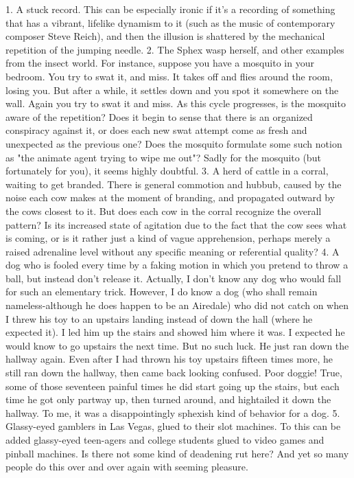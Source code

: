   1. A stuck record. This can be especially ironic if it's a recording of something
     that has a vibrant, lifelike dynamism to it (such as the music of contemporary
     composer Steve Reich), and then the illusion is shattered by the mechanical
     repetition of the jumping needle.
  2. The Sphex wasp herself, and other examples from the insect world. For
     instance, suppose you have a mosquito in your bedroom. You try to swat it,
     and miss. It takes off and flies around the room, losing you. But after a while,
     it settles down and you spot it somewhere on the wall. Again you try to swat
     it and miss. As this cycle progresses, is the mosquito aware of the repetition?
     Does it begin to sense that there is an organized conspiracy against it, or does
     each new swat attempt come as fresh and unexpected as the previous one?
     Does the mosquito formulate some such notion as "the animate agent trying
     to wipe me out"? Sadly for the mosquito (but fortunately for you), it seems
     highly doubtful.
  3. A herd of cattle in a corral, waiting to get branded. There is general
     commotion and hubbub, caused by the noise each cow makes at the moment
     of branding, and propagated outward by the cows closest to it. But does each
     cow in the corral recognize the overall pattern? Is its increased state of
     agitation due to the fact that the cow sees what is coming, or is it rather just a
     kind of vague apprehension, perhaps merely a raised adrenaline level without
     any specific meaning or referential quality?
  4. A dog who is fooled every time by a faking motion in which you pretend to
     throw a ball, but instead don't release it. Actually, I don't know any dog who
     would fall for such an elementary trick. However, I do know a dog (who
     shall remain nameless-although he does happen to be an Airedale) who did
     not catch on when I threw his toy to an upstairs landing instead of down the
     hall (where he expected it). I led him up the stairs and showed him where it
     was. I expected he would know to go upstairs the next time. But no such
     luck. He just ran down the hallway again. Even after I had thrown his toy
     upstairs fifteen times more, he still ran down the hallway, then came back
     looking confused. Poor doggie! True, some of those seventeen painful times
     he did start going up the stairs, but each time he got only partway up, then
     turned around, and hightailed it down the hallway. To me, it was a
     disappointingly sphexish kind of behavior for a dog.
  5. Glassy-eyed gamblers in Las Vegas, glued to their slot machines. To this can
     be added glassy-eyed teen-agers and college students glued to video games
     and pinball machines. Is there not some kind of deadening rut here? And yet
     so many people do this over and over again with seeming pleasure.




